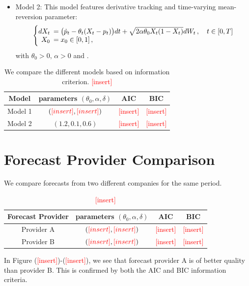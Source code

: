 \documentclass[11pt]{article}
\theoremstyle{definition}
\newcommand{\add}{\textcolor{red}{[insert]}}
\begin{document}
\begin{itemize}
  \item Model 2: This model features derivative tracking and time-varying mean-reversion parameter:  
\begin{equation}
  \left\{
  \begin{array}{@{}rl@{}}
    dX_t \!\!\!&= \big(\dot{p}_t  - \theta_t (X_t - p_t) \big) dt +\sqrt{2 \alpha \theta_0 X_t (1 - X_t)} dW_t\,, \quad t \in [0,T]  \\
   X_0  \!\!\!&=  x_0\in [0,1] \,,
 \end{array}\right.  \label{Model2}
\end{equation}
 with $\theta_0 > 0, \, \alpha > 0$ and .
\end{itemize}

\begin{table}[H]
\centering
\begin{tabular}{cccc}
\toprule
Model   &  parameters $(\theta_0, \alpha,\delta)$   & AIC & BIC \\ \midrule
Model 1 &  $(\add,\add) $    &  \add   &  \add   \\
Model 2 &   $(1.2,0.1,0.6)$   &  \add   &   \add    \\ 
\bottomrule
\end{tabular}
\caption{We compare the different models based on information criterion. \add }
\label{tab:model_comparison}
\end{table}

\section{Forecast Provider Comparison} \label{Section_6}
We compare forecasts from two different companies for the same period.
\begin{table}[H]
\centering
\begin{tabular}{cccc}
\toprule
Forecast Provider & parameters $(\theta_0, \alpha,\delta)$ & AIC & BIC \\ \midrule
Provider A  &  $(\add,\add)$      &  \add   & \add    \\
Provider B  & $(\add,\add) $  &  \add   &   \add  \\ 
\bottomrule
\end{tabular}
\caption{\add}
\label{tab:forcast_comparison}
\end{table}
In Figure (\add)-(\add), we see that forecast provider A is of better quality than provider B. This is confirmed by both the AIC and BIC information criteria.
\end{document}
